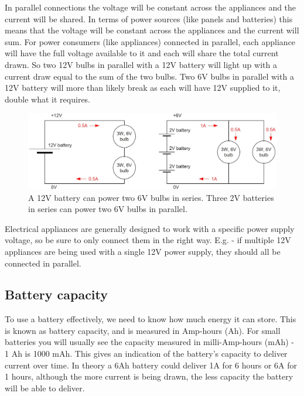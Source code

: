 \documentclass{article}
\theoremstyle{definition}
\theoremstyle{definition}
\theoremstyle{remark}
\begin{document}
    In parallel connections the voltage will be constant across the appliances and the current will be shared. In terms of power sources (like panels and batteries) this means that the voltage will be constant across the appliances and the current will sum. For power consumers (like appliances) connected in parallel, each appliance will have the full voltage available to it and each will share the total current drawn. So two 12V bulbs in parallel with a 12V battery will light up with a current draw equal to the sum of the two bulbs. Two 6V bulbs in parallel with a 12V battery will more than likely break as each will have 12V supplied to it, double what it requires. 

    \begin{figure}[!ht]
      \centering
      \includegraphics[width=0.75\paperwidth]{Images/image_2_1_(parallel_v_series_circuit).png}
        \caption*{\centering A 12V battery can power two 6V bulbs in series. Three 2V batteries in series can power two 6V bulbs in parallel.}
    \end{figure}

    Electrical appliances are generally designed to work with a specific power supply voltage, so be sure to only connect them in the right way. E.g. - if multiple 12V appliances are being used with a single 12V power supply, they should all be connected in parallel.
  

  \subsection{Battery capacity} %
  \label{sub:battery_capacity}

    To use a battery effectively, we need to know how much energy it can store. This is known as battery capacity, and is measured in Amp-hours (Ah). For small batteries you will usually see the capacity measured in milli-Amp-hours (mAh) - 1 Ah is 1000 mAh. This gives an indication of the battery’s capacity to deliver current over time. In theory a 6Ah battery could deliver 1A for 6 hours or 6A for 1 hours, although the more current is being drawn, the less capacity the battery will be able to deliver. 
  
\end{document}
